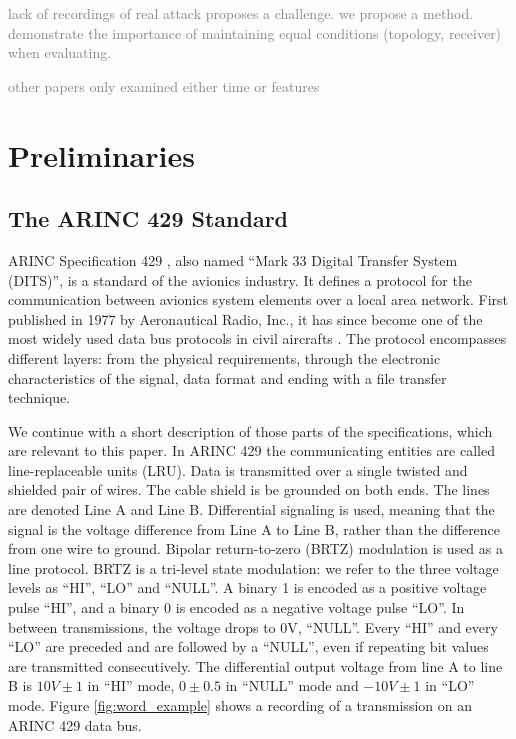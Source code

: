 \documentclass[conference]{IEEEtran}
\begin{document}
  \textcolor{gray}{lack of recordings of real attack proposes a challenge. we propose a method. demonstrate the importance of maintaining equal conditions (topology, receiver) when evaluating.}
  
  \textcolor{gray}{other papers only examined either time or features}

\section{Preliminaries}
\subsection{The ARINC 429 Standard}
  ARINC Specification 429 \cite{}, also named ``Mark 33 Digital Transfer System (DITS)'', is a standard of the avionics industry. It defines a protocol for the communication between avionics system elements over a local area network. First published in 1977 by Aeronautical Radio, Inc., it has since become one of the most widely used data bus protocols in civil aircrafts \cite{}. The protocol encompasses different layers: from the physical requirements, through the electronic characteristics of the signal, data format and ending with a file transfer technique.

  We continue with a short description of those parts of the specifications, which are relevant to this paper. In ARINC 429 the communicating entities are called line-replaceable units (LRU). Data is transmitted over a single twisted and shielded pair of wires. The cable shield is be grounded on both ends. The lines are denoted Line A and Line B. Differential signaling is used, meaning that the signal is the voltage difference from Line A to Line B, rather than the difference from one wire to ground. Bipolar return-to-zero (BRTZ) modulation is used as a line protocol. BRTZ is a tri-level state modulation: we refer to the three voltage levels as ``HI'', ``LO'' and ``NULL''. A binary 1 is encoded as a positive voltage pulse ``HI'', and a binary 0 is encoded as a negative voltage pulse ``LO''. In between transmissions, the voltage drops to 0V, ``NULL''. Every ``HI'' and every ``LO'' are preceded and are followed by a ``NULL'', even if repeating bit values are transmitted consecutively. The differential output voltage from line A to line B is $10V \pm 1$ in ``HI'' mode, $0 \pm 0.5$ in ``NULL'' mode and $-10V \pm 1$ in ``LO'' mode.  Figure \ref{fig:word_example} shows a recording of a transmission on an ARINC 429 data bus.
  
\end{document}
